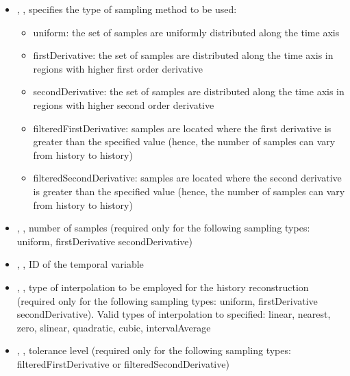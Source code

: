 \begin{itemize}
   \item {}, , specifies the type of sampling method to be used:
   \begin{itemize}
     \item uniform: the set of  samples are uniformly distributed along the time axis
     \item firstDerivative: the set of  samples are distributed along the time axis in regions with 
                            higher first order derivative
     \item secondDerivative: the set of  samples are distributed along the time axis in regions with 
                             higher second order derivative
     \item filteredFirstDerivative: samples are located where the first derivative is greater than the specified  value 
                                    (hence, the number of samples can vary from history to history)
     \item filteredSecondDerivative: samples are located where the second derivative is greater than the specified  value
                                     (hence, the number of samples can vary from history to history)
   \end{itemize}                                 
   \item {}, , number of samples (required only for the following sampling 
                                             types: uniform, firstDerivative secondDerivative)
   \item {}, , ID of the temporal variable
   \item {}, , type of interpolation to be employed for the history reconstruction 
                                           (required only for the following sampling types: uniform, firstDerivative secondDerivative). 
                                           Valid types of interpolation to specified: linear, nearest, zero, slinear, quadratic, cubic, intervalAverage
   \item {}, , tolerance level (required only for the following sampling types: 
                                       filteredFirstDerivative or filteredSecondDerivative)
\end{itemize}

